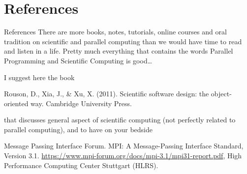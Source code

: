 \documentclass[xcolor={svgnames,usenames}]{beamer}
\begin{document}

\section{References}

\begin{frame}{References}
There are more books, notes, tutorials, online courses and oral tradition on scientific and parallel computing than we would have time to read and listen in a life. Pretty much everything that contains the words Parallel Programming and Scientific Computing is good\ldots 

I suggest here the book
\begin{thebibliography}{10}
	 Rouson, D., Xia, J., \& Xu, X. (2011). Scientific software design: the object-oriented way. Cambridge University Press.
\end{thebibliography}
that discusses general aspect of scientific computing (not perfectly related to parallel computing), and to have on your bedside
\begin{thebibliography}{10}
	  Message Passing Interface Forum. MPI: A Message-Passing Interface Standard, Version 3.1. \url{https://www.mpi-forum.org/docs/mpi-3.1/mpi31-report.pdf}, High Performance Computing Center Stuttgart (HLRS).
\end{thebibliography}
\end{frame}
\end{document}
